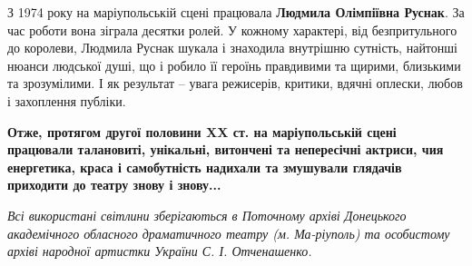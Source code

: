 
З 1974 року на маріупольській сцені працювала \textbf{Людмила Олімпіївна Руснак}. За час
роботи вона зіграла десятки ролей. У кожному характері, від безпритульного до
королеви, Людмила Руснак шукала і знаходила внутрішню сутність, найтонші нюанси
людської душі, що і робило її героїнь правдивими та щирими, близькими та
зрозумілими. І як результат – увага режисерів, критики, вдячні оплески, любов і
захоплення публіки.

\textbf{Отже, протягом другої половини XX ст. на маріупольській сцені працювали
талановиті, унікальні, витончені та непересічні актриси, чия енергетика, краса
і самобутність надихали та змушували глядачів приходити до театру знову і
знову...}

\emph{Всі використані світлини зберігаються в Поточному архіві Донецького
академічного обласного драматичного театру (м. Ма\hyp{}ріуполь) та особистому архіві
народної артистки України С. І. Отченашенко.}

\clearpage
